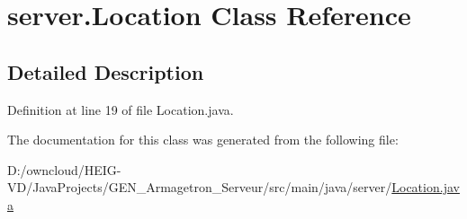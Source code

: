 \hypertarget{classserver_1_1_location}{}\section{server.\+Location Class Reference}
\label{classserver_1_1_location}


\subsection{Detailed Description}


Definition at line 19 of file Location.\+java.



The documentation for this class was generated from the following file\+:\begin{DoxyCompactItemize}
\item 
D\+:/owncloud/\+H\+E\+I\+G-\/\+V\+D/\+Java\+Projects/\+G\+E\+N\+\_\+\+Armagetron\+\_\+\+Serveur/src/main/java/server/\hyperlink{_location_8java}{Location.\+java}\end{DoxyCompactItemize}
